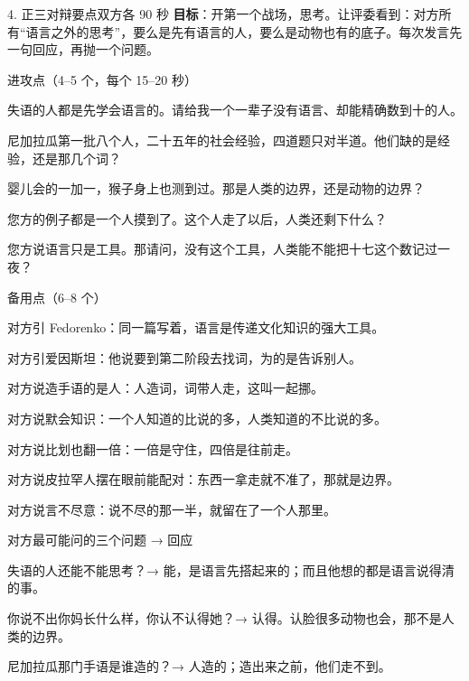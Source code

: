 \documentclass[script,pro]{debate}
\begin{document}
\begin{stage}{4. 正三对辩要点}{双方各 90 秒}
\textbf{目标}：开第一个战场，思考。让评委看到：对方所有“语言之外的思考”，要么是先有语言的人，要么是动物也有的底子。每次发言先一句回应，再抛一个问题。
\begin{points}{进攻点（4–5 个，每个 15–20 秒）}
\item 失语的人都是先学会语言的。请给我一个一辈子没有语言、却能精确数到十的人。
\item 尼加拉瓜第一批八个人，二十五年的社会经验，四道题只对半道。他们缺的是经验，还是那几个词？
\item 婴儿会的一加一，猴子身上也测到过。那是人类的边界，还是动物的边界？
\item 您方的例子都是一个人摸到了。这个人走了以后，人类还剩下什么？
\item 您方说语言只是工具。那请问，没有这个工具，人类能不能把十七这个数记过一夜？
\end{points}
\begin{points}{备用点（6–8 个）}
\item 对方引 Fedorenko：同一篇写着，语言是传递文化知识的强大工具。
\item 对方引爱因斯坦：他说要到第二阶段去找词，为的是告诉别人。
\item 对方说造手语的是人：人造词，词带人走，这叫一起挪。
\item 对方说默会知识：一个人知道的比说的多，人类知道的不比说的多。
\item 对方说比划也翻一倍：一倍是守住，四倍是往前走。
\item 对方说皮拉罕人摆在眼前能配对：东西一拿走就不准了，那就是边界。
\item 对方说言不尽意：说不尽的那一半，就留在了一个人那里。
\end{points}
\begin{points}{对方最可能问的三个问题 → 回应}
\item 失语的人还能不能思考？→ 能，是语言先搭起来的；而且他想的都是语言说得清的事。
\item 你说不出你妈长什么样，你认不认得她？→ 认得。认脸很多动物也会，那不是人类的边界。
\item 尼加拉瓜那门手语是谁造的？→ 人造的；造出来之前，他们走不到。
\end{points}
\end{stage}
\end{document}
